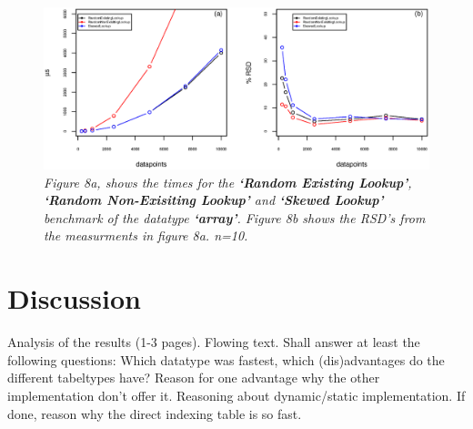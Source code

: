 \documentclass[a4paper,11pt,twoside]{article}
\begin{document}
\begin{figure}[H] 
\centering 
\includegraphics[width=\textwidth]{figures/fig8.eps}
\caption{\textit{Figure 8a, shows the times for the \textbf{`Random Existing
    Lookup'}, \textbf{`Random Non-Exisiting Lookup'} and
  \textbf{`Skewed Lookup'} benchmark of the datatype \textbf{`array'}. Figure 8b shows the RSD's from the measurments
in figure 8a. n=10.}}
\end{figure}


\section{Discussion}
Analysis of the results (1-3 pages). Flowing text. Shall answer at
least the following questions:
Which datatype was fastest, which (dis)advantages do the different
tabeltypes have? Reason for one advantage why the other implementation
don't offer it. Reasoning about dynamic/static implementation. If
done, reason why the direct indexing table is so fast.


\end{document}
